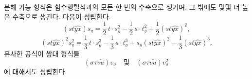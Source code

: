 
분해 가능 형식은 함수행렬식과의 모든 한 번의 수축으로 생기며, 그 밖에도 몇몇 더 높은 수축으로 생긴다. 다음이 성립한다.
\[
(st\widehat{yx})s_y=\frac12\,t\cdot s_y^2-\frac12\,s\cdot t_y^2+\frac12(st\widehat{yx})^2,
\]
\[
(st\widehat{yx})^2s_y^2=\frac13\,t\cdot s_y^3-\frac13\,s\cdot t_y^3+s_y(st\widehat{yx})^2-\frac13(st\widehat{yx})^3.
\]
유사한 공식이 쌍대 형식들
\[
(\sigma\tau\widehat{vu})v_\sigma
\quad\text{및}\quad
(\sigma\tau\widehat{vu})v_\sigma^2
\]
에 대해서도 성립한다.

